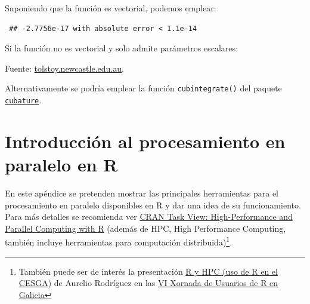 \documentclass[
  10pt,
]{book}
\newenvironment{Shaded}{\begin{snugshade}}{\end{snugshade}}
\newcommand{\ControlFlowTok}[1]{\textcolor[rgb]{0.13,0.29,0.53}{\textbf{#1}}}
\newcommand{\FunctionTok}[1]{\textcolor[rgb]{0.00,0.00,0.00}{#1}}
\newcommand{\NormalTok}[1]{#1}
\newcommand{\SpecialCharTok}[1]{\textcolor[rgb]{0.00,0.00,0.00}{#1}}
\theoremstyle{break}
\theoremstyle{nonumberplain}
\let\oldfootnote\footnote
\renewcommand\footnote[1]{\oldfootnote{\hspace{2mm}#1}}
\begin{document}
Suponiendo que la función es vectorial, podemos emplear:

\begin{Shaded}
\end{Shaded}

\begin{verbatim}
 ## -2.7756e-17 with absolute error < 1.1e-14
\end{verbatim}

Si la función no es vectorial y solo admite parámetros escalares:

\begin{Shaded}
\end{Shaded}

Fuente: \href{http://tolstoy.newcastle.edu.au/R/help/04/10/5951.html}{tolstoy.newcastle.edu.au}.

Alternativamente se podría emplear la función \texttt{cubintegrate()} del paquete \href{https://bnaras.github.io/cubature/}{\texttt{cubature}}.

\hypertarget{intro-hpc}{%
\chapter{Introducción al procesamiento en paralelo en R}\label{intro-hpc}}

En este apéndice se pretenden mostrar las principales herramientas para el procesamiento en paralelo disponibles en R y dar una idea de su funcionamiento.
Para más detalles se recomienda ver \href{https://cran.r-project.org/view=HighPerformanceComputing}{CRAN Task View: High-Performance and Parallel Computing with R}
(además de HPC, High Performance Computing, también incluye herramientas para computación distribuida)\footnote{También puede ser de interés la presentación \href{https://www.r-users.gal/sites/default/files/10_aurelio_rodriguez.pdf}{R y HPC (uso de R en el CESGA)} de Aurelio Rodríguez en las \href{https://www.r-users.gal/pagina/programa-2018}{VI Xornada de Usuarios de R en Galicia}}.
\end{document}
